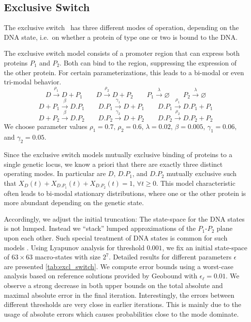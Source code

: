 \subsection{Exclusive Switch}
The exclusive switch~\cite{barzel2008calculation}  has three different modes of operation, depending on the
DNA state, i.e.\ on whether a protein of type one or two is bound to
the DNA.

\begin{model}\label{model:excl_switch}
The exclusive switch model consists of a promoter region
that can express both proteins $P_1$ and $P_2$. Both can bind to the region, suppressing
the expression of the other protein. For certain parameterizations, this leads to a
bi-modal or even tri-modal behavior.
$$ D \xrightarrow{\rho_1} D + P_1 \qquad D \xrightarrow{\rho_2} D + P_2 \qquad P_1 \xrightarrow{\lambda}\varnothing \qquad P_2 \xrightarrow{\lambda} \varnothing $$
$$ D + P_1 \xrightarrow{\beta} D.P_1 \qquad D.P_1 \xrightarrow{\gamma_1} D + P_1 \qquad D.P_1 \xrightarrow{\rho_1} D.P_1 + P_1 $$
$$ D + P_2 \xrightarrow{\beta} D.P_2 \qquad D.P_2 \xrightarrow{\gamma_2} D + P_2 \qquad D.P_2 \xrightarrow{\rho_2} D.P_2 + P_2 $$
We choose parameter values $\rho_1 = 0.7$, $\rho_2 = 0.6$, $\lambda=0.02$, $\beta=0.005$, $\gamma_1 = 0.06$, and $\gamma_2 = 0.05$.
\end{model}
Since the exclusive switch models mutually exclusive binding of proteins to a single genetic locus,
we know a priori that there are exactly three distinct operating modes.
In particular are $D$, $D.P_1$, and $D.P_2$ mutually exclusive such that $X_{D}(t) + X_{D.P_1}(t) + X_{D.P_2}(t) = 1$, $\forall t\geq 0$.
This model characteristic often leads to bi-modal stationary distributions, where one or the other protein is more abundant depending on the genetic state.

Accordingly, we adjust
the initial truncation:
The state-space for the DNA states is not lumped. Instead we ``stack''
lumped approximations of the $P_1$-$P_2$ plane upon each other.
Such special treatment of DNA states is common for such models \cite{lapin2011shave}.
Using Lyapunov analysis for threshold $0.001$, we fix an initial state-space of $63\times 63$ macro-states with size $2^7$. Detailed results for different parameters $\epsilon$ are presented \autoref{tab:excl_switch}.
We compute error bounds using a worst-case analysis based on reference solutions provided by Geobound with $\epsilon_{\ell}=0.01$.
We observe a strong decrease in both upper bounds on the total absolute and maximal absolute error in the final iteration.
Interestingly, the errors between different thresholds are very close in earlier iterations.
This is mainly due to the usage of absolute errors which causes probabilities close to the mode dominate.


